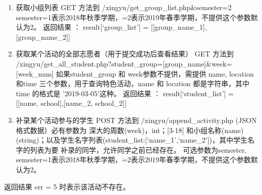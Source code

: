 \documentclass[]{ctexart}
\begin{document}
\begin{enumerate}
\def\labelenumi{\arabic{enumi}.}
\setcounter{enumi}{4}
\item
  获取小组列表 GET 方法到 /xingyu/get\_group\_list.php\&semester=2
  semester=1表示2018年秋季学期，=2表示2019年春季学期，不提供这个参数默认为2。
  返回结果 ： result{[}`group\_list'{]} =
  {[}{[}group\_name\_1{]},{[}group\_name\_2{]}{]}
\item
  获取某个活动的全部志愿者（用于提交成功后查看结果） GET 方法到
  /xingyu/get\_all\_student.php?student\_group={[}group\_name{]}\&week={[}week\_num{]}
  如果student\_group 和 week参数不提供，需提供 name, location 和time
  三个参数，用于查询特色活动，name 和 location 都是字符串，其中 time
  的格式是 '2019-03-05'这种。 返回结果 ： result{[}`student\_list'{]} =
  {[}{[}name, school{]},{[}name\_2, school\_2{]}{]}
\item
  补录某个活动参与的学生 POST 方法到 /xingyu/append\_activity.php
  (JSON格式数据）必有参数为 深大的周数(week)，int；{[}3-18{]}
  和小组名称(name)(string)；以及学生名字列表(student\_list:{[}`name\_1',`name\_2'{]})，其中学生名字的列表为要
  补录的同学，允许同学之前已经存在。 可选参数为semester,
  semester=1表示2018年秋季学期，=2表示2019年春季学期，不提供这个参数默认为2。
\end{enumerate}

返回结果 err = 5 时表示该活动不存在。
\end{document}
